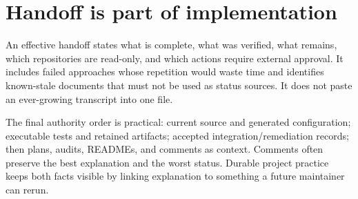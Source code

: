 \section{Handoff is part of implementation}

An effective handoff states what is complete, what was verified, what remains, which repositories
are read-only, and which actions require external approval.  It includes failed approaches whose
repetition would waste time and identifies known-stale documents that must not be used as status
sources.  It does not paste an ever-growing transcript into one file.

The final authority order is practical: current source and generated configuration; executable
tests and retained artifacts; accepted integration/remediation records; then plans, audits,
READMEs, and comments as context.  Comments often preserve the best explanation and the worst
status.  Durable project practice keeps both facts visible by linking explanation to something a
future maintainer can rerun.
